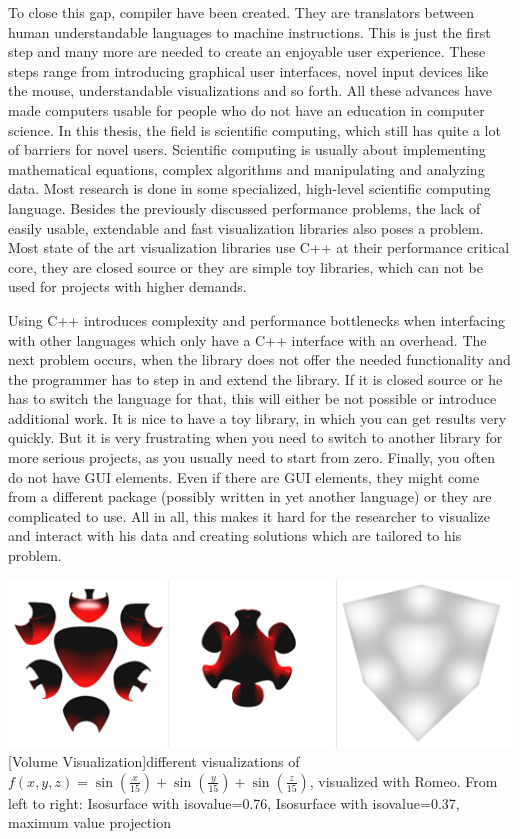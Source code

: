 To close this gap, compiler have been created. They are translators between human understandable languages to machine instructions.
This is just the first step and many more are needed to create an enjoyable user experience.
These steps range from introducing graphical user interfaces, novel input devices like the mouse, understandable visualizations and so forth.
All these advances have made computers usable for people who do not have an education in computer science.
In this thesis, the field is scientific computing, which still has quite a lot of barriers for novel users.
Scientific computing is usually about implementing mathematical equations, complex algorithms and manipulating and analyzing data.
Most research is done in some specialized, high-level scientific computing language.
Besides the previously discussed performance problems, the lack of easily usable, extendable and fast visualization libraries also poses a problem.
Most state of the art visualization libraries use C++ at their performance critical core, they are closed source or they are simple toy libraries, which can not be used for projects with higher demands.

Using C++ introduces complexity and performance bottlenecks when interfacing with other languages which only have a C++ interface with an overhead. 
The next problem occurs, when the library does not offer the needed functionality and the programmer has to step in and extend the library. If it is closed source or he has to switch the language for that, this will either be not possible or introduce additional work. 
It is nice to have a toy library, in which you can get results very quickly. But it is very frustrating when you need to switch to another library for more serious projects, as you usually need to start from zero.
Finally, you often do not have GUI elements. 
Even if there are GUI elements, they might come from a different package (possibly written in yet another language) or they are complicated to use.
All in all, this makes it hard for the researcher to visualize and interact with his data and creating solutions which are tailored to his problem.

\vspace{1em}
\begin{minipage}{\linewidth}
    \centering
    \includegraphics[width=0.7\linewidth]{graphics/surfaces.png}
    [Volume Visualization]{different visualizations of $f(x,y,z)=\sin(\frac{x}{15})+\sin(\frac{y}{15})+\sin(\frac{z}{15})$, visualized with Romeo. From left to right: Isosurface with isovalue=0.76, Isosurface with isovalue=0.37, maximum value projection}
    \label{fig:volume}
\end{minipage}
\vspace{1em}


